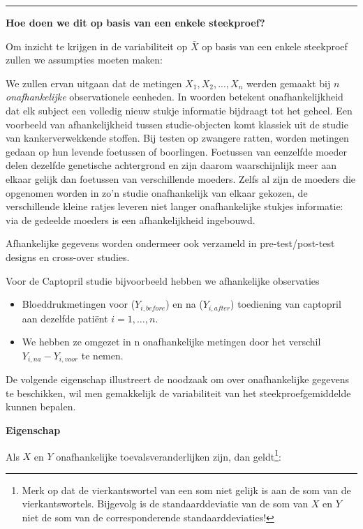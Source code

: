 \documentclass[
  12pt,dutch,coursenotes]{book}
\providecommand{\tightlist}{%
  \setlength{\itemsep}{0pt}\setlength{\parskip}{0pt}}
\theoremstyle{definition}
\theoremstyle{definition}
\theoremstyle{definition}
\theoremstyle{definition}
\theoremstyle{remark}
\begin{document}
\begin{center}\rule{0.5\linewidth}{0.5pt}\end{center}

\textbf{Hoe doen we dit op basis van een enkele steekproef?}

Om inzicht te krijgen in de variabiliteit op \(\bar X\) op basis van een enkele steekproef zullen we assumpties moeten maken:

We zullen ervan uitgaan dat de metingen \(X_1, X_2, ..., X_n\) werden gemaakt bij \(n\) \emph{onafhankelijke}
observationele eenheden. In woorden betekent onafhankelijkheid dat elk subject een volledig
nieuw stukje informatie bijdraagt tot het geheel. Een voorbeeld van
afhankelijkheid tussen studie-objecten komt klassiek uit de studie van
kankerverwekkende stoffen. Bij testen op zwangere ratten, worden metingen
gedaan op hun levende foetussen of boorlingen. Foetussen van eenzelfde
moeder delen dezelfde genetische achtergrond en zijn daarom waarschijnlijk
meer aan elkaar gelijk dan foetussen van verschillende moeders. Zelfs al
zijn de moeders die opgenomen worden in zo'n studie onafhankelijk van elkaar
gekozen, de verschillende kleine ratjes leveren niet langer onafhankelijke
stukjes informatie: via de gedeelde moeders is een afhankelijkheid
ingebouwd.

Afhankelijke gegevens worden ondermeer ook verzameld in
pre-test/post-test designs en cross-over studies.

Voor de Captopril studie bijvoorbeeld hebben we afhankelijke observaties

\begin{itemize}
\tightlist
\item
  Bloeddrukmetingen voor (\(Y_{i,before}\)) en na (\(Y_{i,after}\)) toediening van captopril aan dezelfde patiënt \(i=1,\ldots,n\).
\item
  We hebben ze omgezet in n onafhankelijke metingen door het verschil \(Y_{i,na}-Y_{i,voor}\) te nemen.
\end{itemize}

De volgende eigenschap illustreert de noodzaak om over onafhankelijke gegevens te beschikken,
wil men gemakkelijk de variabiliteit van het steekproefgemiddelde kunnen bepalen.

\textbf{Eigenschap}

Als \(X\) en \(Y\) onafhankelijke toevalsveranderlijken zijn,
dan geldt\footnote{Merk op dat de vierkantswortel van een som niet gelijk is aan de som van de
  vierkantswortels. Bijgevolg is de standaarddeviatie van de som van \(X\) en \(Y\)
  niet de som van de corresponderende standaarddeviaties!}:
\end{document}
